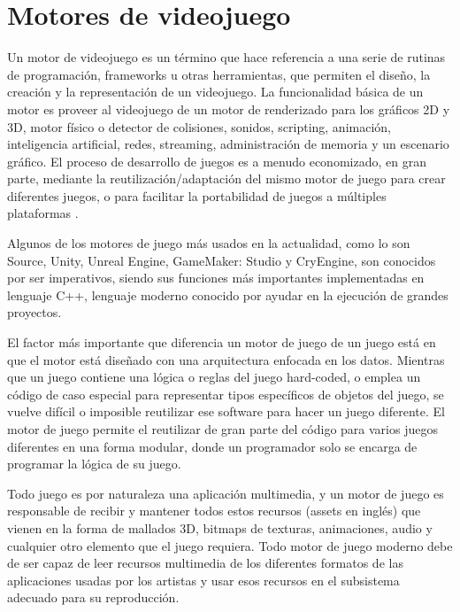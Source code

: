 
\section{Motores de videojuego}  %

\ifpdf
    \graphicspath{{motorJuego/Figs/Raster/}{motorJuego/Figs/PDF/}{motorJuego/Figs/}}
\else
    \graphicspath{{motorJuego/Figs/Vector/}{motorJuego/Figs/}}
\fi

Un motor de videojuego es un término que hace referencia a una serie de rutinas de programación, frameworks u otras herramientas, que permiten el diseño, la creación y la representación de un videojuego. La funcionalidad básica de un motor es proveer al videojuego de un motor de renderizado para los gráficos 2D y 3D, motor físico o detector de colisiones, sonidos, scripting, animación, inteligencia artificial, redes, streaming, administración de memoria y un escenario gráfico. El proceso de desarrollo de juegos es a menudo economizado, en gran parte, mediante la reutilización/adaptación del mismo motor de juego para crear diferentes juegos, o para facilitar la portabilidad de juegos a múltiples plataformas \cite{JasonGregory-GameEngineArchitecture}.

Algunos de los motores de juego más usados en la actualidad, como lo son Source, Unity, Unreal Engine, GameMaker: Studio y CryEngine, son conocidos por ser imperativos, siendo sus funciones más importantes implementadas en lenguaje C++, lenguaje moderno conocido por ayudar en la ejecución de grandes proyectos.

El factor más importante que diferencia un motor de juego de un juego está en que el motor está diseñado con una arquitectura enfocada en los datos. Mientras que un juego contiene una lógica o reglas del juego hard-coded, o emplea un código de caso especial para representar tipos específicos de objetos del juego, se vuelve difícil o imposible reutilizar ese software para hacer un juego diferente. El motor de juego permite el reutilizar de gran parte del código para varios juegos diferentes en una forma modular, donde un programador solo se encarga de programar la lógica de su juego.

Todo juego es por naturaleza una aplicación multimedia, y un motor de juego es responsable de recibir y mantener todos estos recursos (assets en inglés) que vienen en la forma de mallados 3D, bitmaps de texturas, animaciones, audio y cualquier otro elemento que el juego requiera. Todo motor de juego moderno debe de ser capaz de leer recursos multimedia de los diferentes formatos de las aplicaciones usadas por los artistas y usar esos recursos en el subsistema adecuado para su reproducción.

